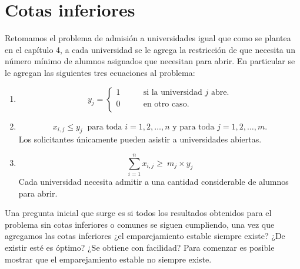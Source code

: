 \chapter{Cotas inferiores}

Retomamos el problema de admisión a universidades igual que como se plantea en el capítulo 4, a cada universidad se le agrega la restricción de que necesita un número mínimo de alumnos asignados que necesitan para abrir. En particular se le agregan las siguientes tres ecuaciones al problema:

\begin{enumerate}
\item \begin{equation} y_{j}= 
\begin{cases}
1 & \qquad \text{si la universidad $j$ abre.} \\
0 &\qquad\text{en otro caso.} \\ 
\end{cases} \end{equation} 
\item \begin{equation} \label{r6}
x_{i,j} \leq y_j \ \text{ para toda $i=1,2,\ldots,n$ y para toda $j=1,2,\ldots,m$.}
\end{equation}
Los solicitantes únicamente pueden asistir a universidades abiertas.
\item \begin{equation} \label{r4}
\sum_{i=1}^{n} x_{i,j} \geq\ m_j\times y_j 
\end{equation}
Cada universidad necesita admitir a una cantidad considerable de alumnos para abrir.
\end{enumerate}

Una pregunta inicial que surge es si todos los resultados obtenidos para el problema sin cotas inferiores o comunes se siguen cumpliendo, una vez que agregamos las cotas inferiores ¿el emparejamiento estable siempre existe? ¿De existir esté es óptimo? ¿Se obtiene con facilidad? Para comenzar es posible mostrar que el emparejamiento estable no siempre existe.

